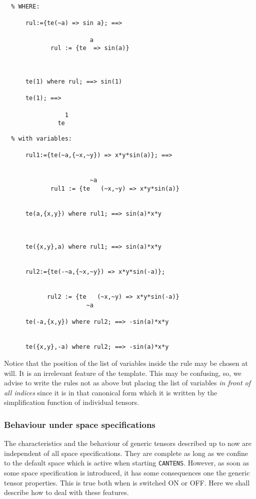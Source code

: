 \begin{verbatim}
  % WHERE:
      
      rul:={te(~a) => sin a}; ==>

                        a
             rul := {te  => sin(a)}
                    


      te(1) where rul; ==> sin(1)

      te(1); ==>

                 1
               te
\end{verbatim}
\begin{verbatim}
  % with variables:

      rul1:={te(~a,{~x,~y}) => x*y*sin(a)}; ==>

    
                        ~a
             rul1 := {te   (~x,~y) => x*y*sin(a)}


      te(a,{x,y}) where rul1; ==> sin(a)*x*y



      te({x,y},a) where rul1; ==> sin(a)*x*y

 
      rul2:={te(-~a,{~x,~y}) => x*y*sin(-a)};


            rul2 := {te   (~x,~y) => x*y*sin(-a)}
                       ~a

      te(-a,{x,y}) where rul2; ==> -sin(a)*x*y

      
      te({x,y},-a) where rul2; ==> -sin(a)*x*y
\end{verbatim}
Notice that the position of the list of variables inside the rule 
may be chosen at will. It is an irrelevant feature of the template.
This may be confusing, so, we advise to write the rules not as 
above but placing the list of variables \emph{in front of all indices}
since it is in that canonical form which it is written by the simplification
function of individual tensors. 

\subsubsection{Behaviour under space specifications}
The characteristics and the behaviour of generic tensors described up to now
are independent of all space specifications. They are complete as long as 
we confine to the default space which is active when starting \texttt{CANTENS}.
However, as soon as some space specification is introduced, it has some
consequences one the generic tensor properties. This is true both when 
 is switched ON or OFF. Here we shall describe 
how to deal with these features.  

